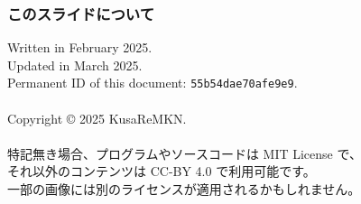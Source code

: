 \documentclass[
  lualatex,
  aspectratio=169,
  14pt
]{beamer}
\begin{document}
\begin{frame}
  \frametitle{このスライドについて}

  Written in February 2025.\\
  Updated in March 2025.\\
  \hspace{1.5\zw}Permanent ID of this document: \texttt{55b54dae70afe9e9}.
  \\~\\[-.5\baselineskip]

  Copyright © 2025 KusaReMKN.
  \\~\\[-.5\baselineskip]

  特記無き場合、プログラムやソースコードは MIT License で、\\
  \hspace{1.5\zw}それ以外のコンテンツは CC-BY 4.0 で利用可能です。\\
  \hspace{1.5\zw}一部の画像には別のライセンスが適用されるかもしれません。
\end{frame}
\end{document}
